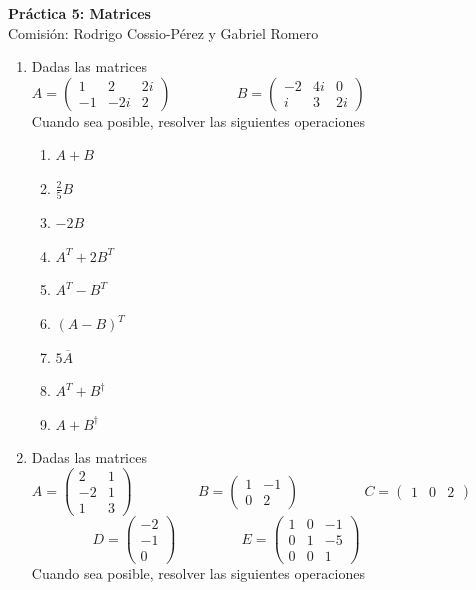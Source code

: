 \documentclass[a4paper]{article}
\newcommand{\exercise}{\item}
\begin{document}
\noindent \hrulefill 
\vspace{-7pt}
\begin{center} 
	\textbf{ Práctica 5: Matrices } \\
	Comisión: Rodrigo Cossio-Pérez y Gabriel Romero
\end{center}
\vspace{-10pt}
\hrulefill
\begin{enumerate}
	\exercise Dadas las matrices \vspace{2mm} \\ \vspace{2mm} $A=\left(\begin{matrix} 1 & 2 & 2i\\ -1 & -2i & 2 \end{matrix}\right)$ ~~~~~~~~ $B=\left(\begin{matrix} -2 & 4i & 0\\ i & 3 & 2i \end{matrix}\right)$ \\ Cuando sea posible, resolver las siguientes operaciones
	\begin{multicols}{3}
	\begin{enumerate} [label=(\alph*)]
		\item $A+B$
		\item $\frac{2}{5} B$
		\item $-2B$
		\item $A^T+2B^T$
		\item $A^T-B^T$
		\item $(A-B)^T$
		\item $5\overline{A}$
		\item $A^T+B^{\dagger}$
		\item $A+B^{\dagger}$
	\end{enumerate}
	\end{multicols}
	\exercise Dadas las matrices \vspace{2mm} \\ \vspace{2mm} $A=\left(\begin{matrix} 2 & 1\\ -2 & 1 \\ 1 & 3 \end{matrix}\right)$ ~~~~~~~~ $B=\left(\begin{matrix} 1 & -1\\ 0 & 2 \end{matrix}\right)$ ~~~~~~~~ $C=\left(\begin{matrix} 1 & 0 & 2 \end{matrix}\right)$ ~~~~~~~~ $D=\left(\begin{matrix} -2 \\ -1 \\ 0 \end{matrix}\right)$ ~~~~~~~~ $E=\left(\begin{matrix} 1 & 0 & -1 \\ 0 & 1 & -5 \\ 0 & 0 & 1 \end{matrix}\right)$ \\ Cuando sea posible, resolver las siguientes operaciones

\end{enumerate}
\end{document}
